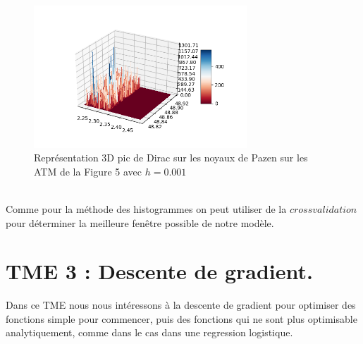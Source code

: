 \documentclass{article}
\begin{document}
\begin{figure}[h]
	\center
	\includegraphics[width=8cm]{../tme2/parzen3Dh=001.png} 
	 \caption{Représentation 3D pic de Dirac sur les noyaux de Pazen sur les ATM de la Figure 5 avec $h=0.001$ }
	 
\end{figure}
\\
Comme pour la méthode des histogrammes on peut utiliser de la $cross validation$ pour déterminer la meilleure fenêtre possible de notre modèle.
\clearpage
\section{TME 3 : Descente de gradient.}
Dans ce TME nous nous intéressons à la descente de gradient pour optimiser des fonctions simple pour commencer, puis des fonctions qui ne sont plus optimisable analytiquement, comme dans le cas dans une regression logistique.
\end{document}

